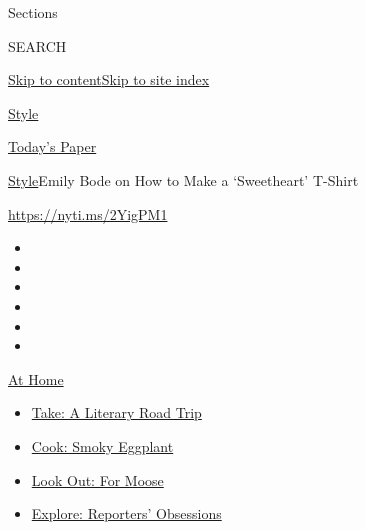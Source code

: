 Sections

SEARCH

\protect\hyperlink{site-content}{Skip to
content}\protect\hyperlink{site-index}{Skip to site index}

\href{https://www.nytimes3xbfgragh.onion/section/style}{Style}

\href{https://myaccount.nytimes3xbfgragh.onion/auth/login?response_type=cookie\&client_id=vi}{}

\href{https://www.nytimes3xbfgragh.onion/section/todayspaper}{Today's
Paper}

\href{/section/style}{Style}\textbar{}Emily Bode on How to Make a
`Sweetheart' T-Shirt

\url{https://nyti.ms/2YigPM1}

\begin{itemize}
\item
\item
\item
\item
\item
\item
\end{itemize}

\href{https://www.nytimes3xbfgragh.onion/spotlight/at-home?action=click\&pgtype=Article\&state=default\&region=TOP_BANNER\&context=at_home_menu}{At
Home}

\begin{itemize}
\tightlist
\item
  \href{https://www.nytimes3xbfgragh.onion/2020/07/28/books/time-for-a-literary-road-trip.html?action=click\&pgtype=Article\&state=default\&region=TOP_BANNER\&context=at_home_menu}{Take:
  A Literary Road Trip}
\item
  \href{https://www.nytimes3xbfgragh.onion/2020/07/29/magazine/bored-with-your-home-cooking-some-smoky-eggplant-will-fix-that.html?action=click\&pgtype=Article\&state=default\&region=TOP_BANNER\&context=at_home_menu}{Cook:
  Smoky Eggplant}
\item
  \href{https://www.nytimes3xbfgragh.onion/2020/07/27/travel/moose-michigan-isle-royale.html?action=click\&pgtype=Article\&state=default\&region=TOP_BANNER\&context=at_home_menu}{Look
  Out: For Moose}
\item
  \href{https://www.nytimes3xbfgragh.onion/interactive/2020/at-home/even-more-reporters-editors-diaries-lists-recommendations.html?action=click\&pgtype=Article\&state=default\&region=TOP_BANNER\&context=at_home_menu}{Explore:
  Reporters' Obsessions}
\end{itemize}

